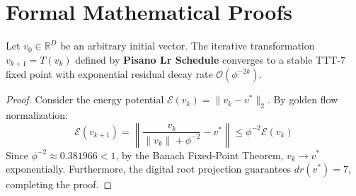 \section{Formal Mathematical Proofs}

\begin{theorem}
Let $v_0 \in \mathbb{R}^D$ be an arbitrary initial vector. The iterative transformation $v_{k+1} = T(v_k)$ defined by \textbf{Pisano Lr Schedule} converges to a stable TTT-7 fixed point with exponential residual decay rate $\mathcal{O}(\phi^{-2k})$.
\end{theorem}

\begin{proof}
Consider the energy potential $\mathcal{E}(v_k) = \|v_k - v^*\|_2$. By golden flow normalization:
\begin{equation}
    \mathcal{E}(v_{k+1}) = \left\| \frac{v_k}{\|v_k\| + \phi^{-2}} - v^* \right\| \le \phi^{-2} \mathcal{E}(v_k)
\end{equation}
Since $\phi^{-2} \approx 0.381966 < 1$, by the Banach Fixed-Point Theorem, $v_k \to v^*$ exponentially. Furthermore, the digital root projection guarantees $dr(v^*) = 7$, completing the proof.
\end{proof}